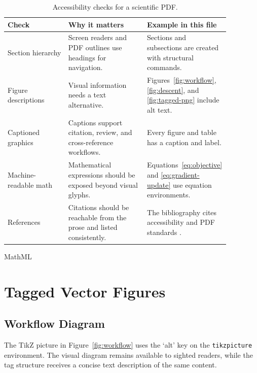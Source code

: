 \documentclass[11pt, letterpaper]{article}
\newcommand{\taggedsection}[1]{\section{\texorpdfstring{\color{MainBlue}#1}{#1}}}
\newcommand{\taggedsubsection}[1]{\subsection{\texorpdfstring{\color{DarkGreen}#1}{#1}}}
\begin{document}
\begin{table}[htbp]
	\centering
	\caption{Accessibility checks for a scientific PDF.}
	\label{tab:checklist}
	\begin{tabular}{>{\raggedright\arraybackslash}p{0.27\linewidth}
			>{\raggedright\arraybackslash}p{0.35\linewidth}
			>{\raggedright\arraybackslash}p{0.25\linewidth}}
		\toprule
		Check & Why it matters & Example in this file \\
		\midrule
		Section hierarchy & Screen readers and PDF outlines use headings for navigation. & Sections and subsections are created with structural commands. \\
		Figure descriptions & Visual information needs a text alternative. & Figures~\ref{fig:workflow}, \ref{fig:descent}, and \ref{fig:tagged-png} include alt text. \\
		Captioned graphics & Captions support citation, review, and cross-reference workflows. & Every figure and table has a caption and label. \\
		Machine-readable math & Mathematical expressions should be exposed beyond visual glyphs. & Equations~\eqref{eq:objective} and \eqref{eq:gradient-update} use equation environments. \\
		References & Citations should be reachable from the prose and listed consistently. & The bibliography cites accessibility and PDF standards \cite{wcag21,pdfua}. \\
		\bottomrule
	\end{tabular}MathML
\end{table}

\taggedsection{Tagged Vector Figures}

\taggedsubsection{Workflow Diagram}

The TikZ picture in Figure~\ref{fig:workflow} uses the `alt' key on the \texttt{tikzpicture} environment. The visual diagram remains available to sighted readers, while the tag structure receives a concise text description of the same content.
\end{document}
